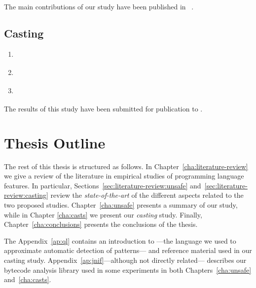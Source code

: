 The main contributions of our \unsafe{} \api{} study have been published in ~\citep{mastrangeloUseYourOwn2015}.

\subsection*{Casting}

\begin{enumerate}[label=$RQ/C\arabic*:$,leftmargin=3.4\parindent]
\item {\bf \crqA} \crqAdesc{}
\item {\bf \crqB} \crqBdesc{}
\item {\bf \crqC} \crqCdesc{}
\end{enumerate}

The results of this study have been submitted for publication to .


\section{Thesis Outline}

The rest of this thesis is structured as follows.
In Chapter~\ref{cha:literature-review} we give a review of the literature in empirical studies of programming language features.
In particular, Sections~\ref{sec:literature-review:unsafe} and~\ref{sec:literature-review:casting} review the \emph{state-of-the-art} of the different aspects related to the two proposed studies.
Chapter~\ref{cha:unsafe} presents a summary of our \unsafe{} study,
while in Chapter \ref{cha:casts} we present our \emph{casting} study.
Finally, Chapter~\ref{cha:conclusions} presents the conclusions of the thesis.

The Appendix~\ref{ap:ql} contains an introduction to \ql{}%
---the language we used to approximate automatic detection of patterns---%
and reference material used in our casting study.
Appendix~\ref{ap:jnif}---although not directly related---%
describes our bytecode analysis library used in some experiments in both Chapters~\ref{cha:unsafe} and~\ref{cha:casts}.
